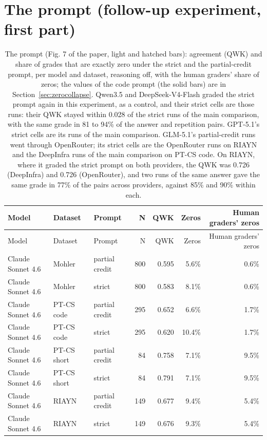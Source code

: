 \documentclass[10pt]{article}
\begin{document}
\section{The prompt (follow-up experiment, first part)}
\begingroup\footnotesize
\begin{longtable}{ll>{\raggedright\arraybackslash}p{3.2cm}rrrr}
\caption{The prompt (Fig. 7 of the paper, light and hatched bars): agreement (QWK) and share of grades that are exactly zero under the strict and the partial-credit prompt, per model and dataset, reasoning off, with the human graders' share of zeros; the values of the code prompt (the solid bars) are in Section~\ref{sec:zerocollapse}. Qwen3.5 and DeepSeek-V4-Flash graded the strict prompt again in this experiment, as a control, and their strict cells are those runs: their QWK stayed within 0.028 of the strict runs of the main comparison, with the same grade in 81 to 94\% of the answer and repetition pairs. GPT-5.1's strict cells are its runs of the main comparison. GLM-5.1's partial-credit runs went through OpenRouter; its strict cells are the OpenRouter runs on RIAYN and the DeepInfra runs of the main comparison on PT-CS code. On RIAYN, where it graded the strict prompt on both providers, the QWK was 0.726 (DeepInfra) and 0.726 (OpenRouter), and two runs of the same answer gave the same grade in 77\% of the pairs across providers, against 85\% and 90\% within each.}\\
\hline
Model & Dataset & Prompt & N & QWK & Zeros & Human graders' zeros \\ \hline
\endfirsthead
\hline
Model & Dataset & Prompt & N & QWK & Zeros & Human graders' zeros \\ \hline
\endhead
Claude Sonnet 4.6 & Mohler & partial credit & 800 & 0.595 & 5.6\% & 0.6\% \\
Claude Sonnet 4.6 & Mohler & strict & 800 & 0.583 & 8.1\% & 0.6\% \\
Claude Sonnet 4.6 & PT-CS code & partial credit & 295 & 0.652 & 6.6\% & 1.7\% \\
Claude Sonnet 4.6 & PT-CS code & strict & 295 & 0.620 & 10.4\% & 1.7\% \\
Claude Sonnet 4.6 & PT-CS short & partial credit & 84 & 0.758 & 7.1\% & 9.5\% \\
Claude Sonnet 4.6 & PT-CS short & strict & 84 & 0.791 & 7.1\% & 9.5\% \\
Claude Sonnet 4.6 & RIAYN & partial credit & 149 & 0.677 & 9.4\% & 5.4\% \\
Claude Sonnet 4.6 & RIAYN & strict & 149 & 0.676 & 9.3\% & 5.4\% \\

\end{longtable}
\end{document}
